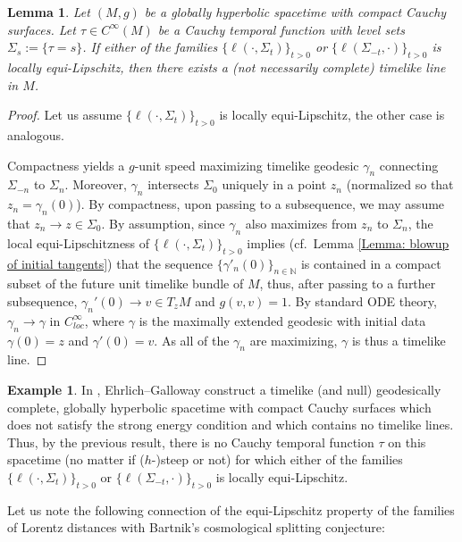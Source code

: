 \documentclass[a4paper,11pt]{article}
\numberwithin{equation}{section}
\theoremstyle{definition}
\newtheorem{Example}[Definition]{Example}
\theoremstyle{plain}
\newtheorem{Lemma}[Definition]{Lemma}
\newcommand{\N}{\mathbb N}
\begin{document}
\begin{Lemma}
\label{L:equi-Lipschitz implies splitting}
    Let $(M,g)$ be a globally hyperbolic spacetime with compact Cauchy surfaces. Let $\tau \in C^\infty(M)$ be a Cauchy temporal function with level sets $\Sigma_s:=\{\tau = s\}$. If either of the families $\{\ell(\cdot,\Sigma_t)\}_{t > 0}$ or $\{\ell(\Sigma_{-t},\cdot)\}_{t > 0}$ is locally equi-Lipschitz, then there exists a (not necessarily complete) timelike line in $M$.
\end{Lemma}

\begin{proof}
    Let us assume $\{\ell(\cdot,\Sigma_t)\}_{t > 0}$ is locally equi-Lipschitz, the other case is analogous. 
    
    Compactness yields a $g$-unit speed maximizing timelike geodesic $\gamma_n$ connecting $\Sigma_{-n}$ to $\Sigma_n$. Moreover, $\gamma_n$ intersects $\Sigma_0$ uniquely in a point $z_n$ (normalized so that $z_n = \gamma_n(0)$). By compactness, upon passing to a subsequence, we may assume that $z_n \to z \in \Sigma_0$. By assumption, since $\gamma_n$ also maximizes from $z_n$ to $\Sigma_n$, the local equi-Lipschitzness of $\{\ell(\cdot,\Sigma_t)\}_{t > 0}$ implies (cf.\ Lemma \ref{Lemma: blowup of initial tangents}) that the sequence $\{\gamma'_n(0)\}_{n \in \N}$ is contained in a compact subset of the future unit timelike bundle of $M$, thus, after passing to a further subsequence, $\gamma_n'(0) \to v \in T_{z}M$ and $g(v,v) = 1$. By standard ODE theory, $\gamma_n \to \gamma$ in $C^\infty_{loc}$, where $\gamma$ is the maximally extended geodesic with initial data $\gamma(0) = z$ and $\gamma'(0) = v$. As all of the $\gamma_n$ are maximizing, $\gamma$ is thus a timelike line.
\end{proof}

\begin{Example}
    In \cite{EhrlichGallowayTimelikelines}, Ehrlich--Galloway construct a timelike (and null) geodesically complete, globally hyperbolic spacetime with compact Cauchy surfaces which does not satisfy the strong energy condition and which contains no timelike lines. Thus, by the previous result, there is no Cauchy temporal function $\tau$ on this spacetime (no matter if ($h$-)steep or not) for which either of the families $\{\ell(\cdot,\Sigma_t)\}_{t > 0}$ or $\{\ell(\Sigma_{-t},\cdot)\}_{t > 0}$ is locally equi-Lipschitz.
\end{Example}

Let us note the following connection of the equi-Lipschitz property of the families of Lorentz distances with Bartnik's cosmological splitting conjecture:
\end{document}
